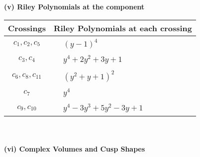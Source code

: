 \documentclass[1p]{elsarticle_modified}
\theoremstyle{definition}
\begin{document}
\newpage\renewcommand{\arraystretch}{1}
\flushleft \textbf{(v) Riley Polynomials at the component}\newline \\
\begin{tabular}{m{50pt}|m{274pt}}
Crossings & \hspace{64pt}Riley Polynomials at each crossing \\
\hline $$\begin{aligned}c_{1},c_{2},c_{5}\end{aligned}$$&$\begin{aligned}
&(y-1)^4
\end{aligned}$\\
\hline $$\begin{aligned}c_{3},c_{4}\end{aligned}$$&$\begin{aligned}
&y^4+2 y^2+3 y+1
\end{aligned}$\\
\hline $$\begin{aligned}c_{6},c_{8},c_{11}\end{aligned}$$&$\begin{aligned}
&(y^2+y+1)^2
\end{aligned}$\\
\hline $$\begin{aligned}c_{7}\end{aligned}$$&$\begin{aligned}
&y^4
\end{aligned}$\\
\hline $$\begin{aligned}c_{9},c_{10}\end{aligned}$$&$\begin{aligned}
&y^4-3 y^3+5 y^2-3 y+1
\end{aligned}$\\
\hline
\end{tabular}\\~\\
\newpage\flushleft \textbf{(vi) Complex Volumes and Cusp Shapes}
\end{document}

